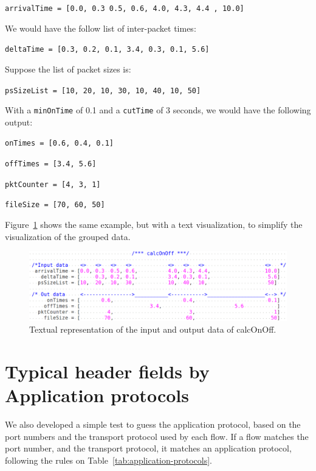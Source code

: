 \texttt{arrivalTime  = [0.0, 0.3  0.5, 0.6, 4.0, 4.3, 4.4 , 10.0] }

We would have the follow list of inter-packet times: 

\texttt{deltaTime = [0.3, 0.2, 0.1, 3.4,  0.3, 0.1, 5.6]}

Suppose the list of packet sizes is:

\texttt{psSizeList = [10, 20, 10, 30, 10, 40, 10, 50]}


With a \texttt{minOnTime} of 0.1 and a \texttt{cutTime} of 3 seconds, we would have the following output:

\texttt{onTimes = [0.6, 0.4, 0.1]}

\texttt{offTimes  = [3.4, 5.6]}

\texttt{pktCounter  = [4, 3, 1]}

\texttt{fileSize  = [70, 60, 50]}

Figure~\ref{fig:on-off} shows the same example, but with a text visualization, to simplify the visualization of the grouped data.

\begin{figure}
    \centering
    \includegraphics[width=\linewidth]{figures/ch4/on-off}
    \caption{Textual representation of the input and output data of calcOnOff.}
    \label{fig:on-off}
\end{figure}


\section{Typical header fields by Application protocols}


We also developed a simple test to guess the application protocol, based on the port numbers and the transport protocol used by each flow. If a flow matches the port number, and the transport protocol, it matches an application protocol, following the rules on Table~\ref{tab:application-protocols}. 


